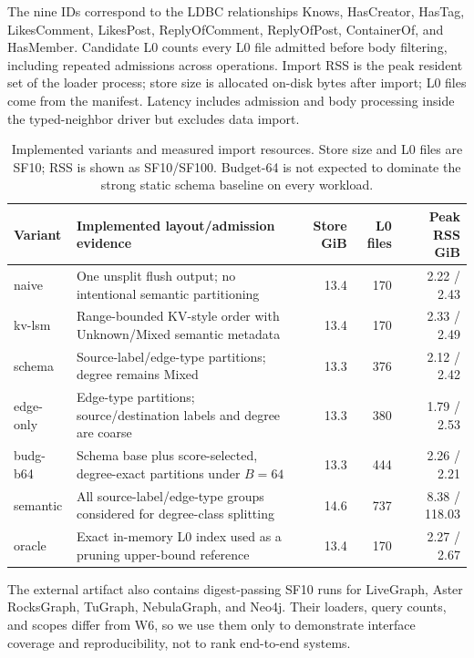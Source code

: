 \documentclass[sigconf,screen]{cidr-2027}
\begin{document}
The nine IDs correspond to the LDBC relationships Knows, HasCreator, HasTag,
LikesComment, LikesPost, ReplyOfComment, ReplyOfPost, ContainerOf, and
HasMember. Candidate L0 counts every L0 file admitted before body
filtering, including repeated admissions across operations. Import RSS is the
peak resident set of the loader process; store size is allocated on-disk bytes
after import; L0 files come from the manifest. Latency includes admission and
body processing inside the typed-neighbor driver but excludes data import.

\begin{table}[t]
\centering
\scriptsize
\caption{Implemented variants and measured import resources. Store size and
L0 files are SF10; RSS is shown as SF10/SF100. Budget-64 is not expected to
dominate the strong static schema baseline on every workload.}
\label{tab:variants}
\begin{tabular}{p{}p{}rrr}
\toprule
Variant & Implemented layout/admission evidence & Store GiB & L0 files & Peak RSS GiB \\
\midrule
naive & One unsplit flush output; no intentional semantic partitioning & 13.4 & 170 & 2.22 / 2.43 \\
kv-lsm & Range-bounded KV-style order with Unknown/Mixed semantic metadata & 13.4 & 170 & 2.33 / 2.49 \\
schema & Source-label/edge-type partitions; degree remains Mixed & 13.3 & 376 & 2.12 / 2.42 \\
edge-only & Edge-type partitions; source/destination labels and degree are coarse & 13.3 & 380 & 1.79 / 2.53 \\
budg-b64 & Schema base plus score-selected, degree-exact partitions under $B=64$ & 13.3 & 444 & 2.26 / 2.21 \\
semantic & All source-label/edge-type groups considered for degree-class splitting & 14.6 & 737 & 8.38 / 118.03 \\
oracle & Exact in-memory L0 index used as a pruning upper-bound reference & 13.4 & 170 & 2.27 / 2.67 \\
\bottomrule
\end{tabular}
\end{table}

The external artifact also contains digest-passing SF10 runs for LiveGraph,
Aster RocksGraph, TuGraph, NebulaGraph, and Neo4j. Their loaders, query counts,
and scopes differ from W6, so we use them only to demonstrate interface
coverage and reproducibility, not to rank end-to-end systems.
\end{document}
